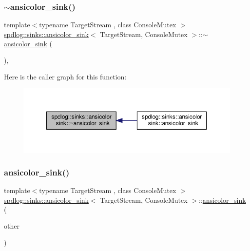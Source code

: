 \subsubsection{\texorpdfstring{$\sim$ansicolor\+\_\+sink()}{~ansicolor\_sink()}}
{\footnotesize\ttfamily template$<$typename Target\+Stream , class Console\+Mutex $>$ \\
\hyperlink{classspdlog_1_1sinks_1_1ansicolor__sink}{spdlog\+::sinks\+::ansicolor\+\_\+sink}$<$ Target\+Stream, Console\+Mutex $>$\+::$\sim$\hyperlink{classspdlog_1_1sinks_1_1ansicolor__sink}{ansicolor\+\_\+sink} (\begin{DoxyParamCaption}{ }\end{DoxyParamCaption})\hspace{0.3cm}{\ttfamily [override]}, {\ttfamily [default]}}

Here is the caller graph for this function\+:
\nopagebreak
\begin{figure}[H]
\begin{center}
\leavevmode
\includegraphics[width=350pt]{classspdlog_1_1sinks_1_1ansicolor__sink_abca2e1439a310ff1a4d75044a5c718d1_icgraph}
\end{center}
\end{figure}
\mbox{\label{classspdlog_1_1sinks_1_1ansicolor__sink_ab169c076bac30ee54cf369a7f6bfb2ea}} 
\subsubsection{\texorpdfstring{ansicolor\+\_\+sink()}{ansicolor\_sink()}\hspace{0.1cm}{\footnotesize\ttfamily [2/2]}}
{\footnotesize\ttfamily template$<$typename Target\+Stream , class Console\+Mutex $>$ \\
\hyperlink{classspdlog_1_1sinks_1_1ansicolor__sink}{spdlog\+::sinks\+::ansicolor\+\_\+sink}$<$ Target\+Stream, Console\+Mutex $>$\+::\hyperlink{classspdlog_1_1sinks_1_1ansicolor__sink}{ansicolor\+\_\+sink} (\begin{DoxyParamCaption}\item[{const \hyperlink{classspdlog_1_1sinks_1_1ansicolor__sink}{ansicolor\+\_\+sink}$<$ Target\+Stream, Console\+Mutex $>$ \&}]{other }\end{DoxyParamCaption})\hspace{0.3cm}{\ttfamily [delete]}}



